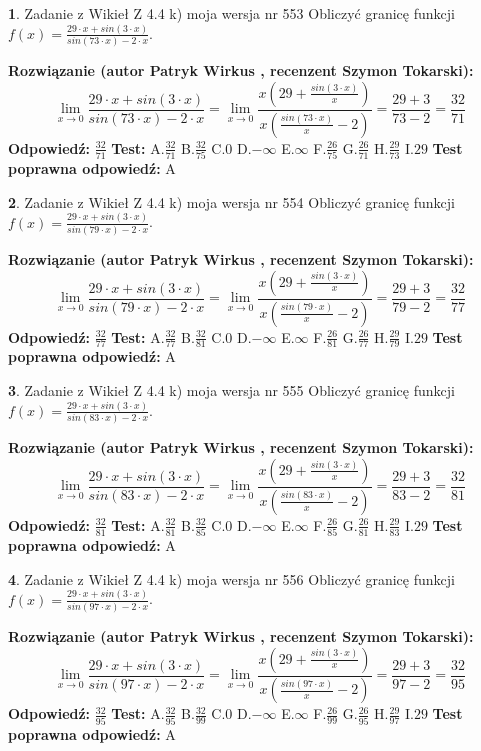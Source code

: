 \documentclass[12pt, a4paper]{article}
\theoremstyle{definition} %
\newtheorem{zad}{}
\newcommand{\zadStart}[1]{\begin{zad}#1\newline}
\newcommand{\zadStop}{\end{zad}}
\newcommand{\rozwStart}[2]{\noindent \textbf{Rozwiązanie (autor #1 , recenzent #2): }\newline}
\newcommand{\rozwStop}{\newline}
\newcommand{\odpStart}{\noindent \textbf{Odpowiedź:}\newline}
\newcommand{\odpStop}{\newline}
\newcommand{\testStart}{\noindent \textbf{Test:}\newline}
\newcommand{\testStop}{\newline}
\newcommand{\kluczStart}{\noindent \textbf{Test poprawna odpowiedź:}\newline}
\newcommand{\kluczStop}{\newline}
\begin{document}
\zadStart{Zadanie z Wikieł Z 4.4 k) moja wersja nr 553}
Obliczyć granicę funkcji $f(x)=\frac{29\cdot x +sin(3\cdot x)}{sin(73\cdot x) -2\cdot x}$.
\zadStop
\rozwStart{Patryk Wirkus}{Szymon Tokarski}
$$\lim\limits_{x\to 0}\frac{29\cdot x +sin(3\cdot x)}{sin(73\cdot x) -2\cdot x}
=\lim\limits_{x\to 0}\frac{x(29+\frac{sin(3\cdot x)}{x})}{x(\frac{sin(73\cdot x)}{x}-2)}
=\frac{29+3}{73-2} = \frac{32}{71}$$
\rozwStop
\odpStart
$\frac{32}{71}$
\odpStop
\testStart
A.$\frac{32}{71}$
B.$\frac{32}{75}$
C.$0$
D.$-\infty$
E.$\infty$
F.$\frac{26}{75}$
G.$\frac{26}{71}$
H.$\frac{29}{73}$
I.$29$
\testStop
\kluczStart
A
\kluczStop



\zadStart{Zadanie z Wikieł Z 4.4 k) moja wersja nr 554}
Obliczyć granicę funkcji $f(x)=\frac{29\cdot x +sin(3\cdot x)}{sin(79\cdot x) -2\cdot x}$.
\zadStop
\rozwStart{Patryk Wirkus}{Szymon Tokarski}
$$\lim\limits_{x\to 0}\frac{29\cdot x +sin(3\cdot x)}{sin(79\cdot x) -2\cdot x}
=\lim\limits_{x\to 0}\frac{x(29+\frac{sin(3\cdot x)}{x})}{x(\frac{sin(79\cdot x)}{x}-2)}
=\frac{29+3}{79-2} = \frac{32}{77}$$
\rozwStop
\odpStart
$\frac{32}{77}$
\odpStop
\testStart
A.$\frac{32}{77}$
B.$\frac{32}{81}$
C.$0$
D.$-\infty$
E.$\infty$
F.$\frac{26}{81}$
G.$\frac{26}{77}$
H.$\frac{29}{79}$
I.$29$
\testStop
\kluczStart
A
\kluczStop



\zadStart{Zadanie z Wikieł Z 4.4 k) moja wersja nr 555}
Obliczyć granicę funkcji $f(x)=\frac{29\cdot x +sin(3\cdot x)}{sin(83\cdot x) -2\cdot x}$.
\zadStop
\rozwStart{Patryk Wirkus}{Szymon Tokarski}
$$\lim\limits_{x\to 0}\frac{29\cdot x +sin(3\cdot x)}{sin(83\cdot x) -2\cdot x}
=\lim\limits_{x\to 0}\frac{x(29+\frac{sin(3\cdot x)}{x})}{x(\frac{sin(83\cdot x)}{x}-2)}
=\frac{29+3}{83-2} = \frac{32}{81}$$
\rozwStop
\odpStart
$\frac{32}{81}$
\odpStop
\testStart
A.$\frac{32}{81}$
B.$\frac{32}{85}$
C.$0$
D.$-\infty$
E.$\infty$
F.$\frac{26}{85}$
G.$\frac{26}{81}$
H.$\frac{29}{83}$
I.$29$
\testStop
\kluczStart
A
\kluczStop



\zadStart{Zadanie z Wikieł Z 4.4 k) moja wersja nr 556}
Obliczyć granicę funkcji $f(x)=\frac{29\cdot x +sin(3\cdot x)}{sin(97\cdot x) -2\cdot x}$.
\zadStop
\rozwStart{Patryk Wirkus}{Szymon Tokarski}
$$\lim\limits_{x\to 0}\frac{29\cdot x +sin(3\cdot x)}{sin(97\cdot x) -2\cdot x}
=\lim\limits_{x\to 0}\frac{x(29+\frac{sin(3\cdot x)}{x})}{x(\frac{sin(97\cdot x)}{x}-2)}
=\frac{29+3}{97-2} = \frac{32}{95}$$
\rozwStop
\odpStart
$\frac{32}{95}$
\odpStop
\testStart
A.$\frac{32}{95}$
B.$\frac{32}{99}$
C.$0$
D.$-\infty$
E.$\infty$
F.$\frac{26}{99}$
G.$\frac{26}{95}$
H.$\frac{29}{97}$
I.$29$
\testStop
\kluczStart
A
\kluczStop
\end{document}

